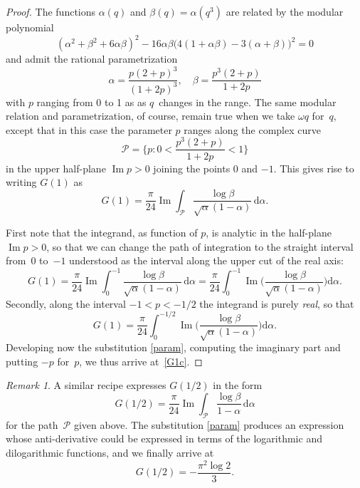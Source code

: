 \documentclass[12pt,reqno]{amsart}
\theoremstyle{remark}
\newtheorem*{remark}{Remark}
\begin{document}
\begin{proof}
The functions $\alpha(q)$ and $\beta(q)=\alpha(q^3)$ are related by the modular polynomial
$$
(\alpha^2+\beta^2+6\alpha\beta)^2-16\alpha\beta\bigl(4(1+\alpha\beta)-3(\alpha+\beta)\bigr)^2=0
$$
and admit the rational parametrization
\begin{equation}
\alpha=\frac{p(2+p)^3}{(1+2p)^3}, \quad \beta=\frac{p^3(2+p)}{1+2p}
\label{param}
\end{equation}
with $p$ ranging from 0 to 1 as as $q$~changes in the range.
The same modular relation and parametrization, of course, remain true when we take
$\omega q$ for~$q$, except that in this case the parameter $p$ ranges along the
complex curve
$$
\mathcal P=\biggl\{p:0<\frac{p^3(2+p)}{1+2p}<1\biggr\}
$$
in the upper half-plane ${\operatorname{Im}} p>0$ joining the points 0 and $-1$.
This gives rise to writing $G(1)$ as
\begin{equation*}
G(1)=\frac{\pi}{24}{\operatorname{Im}}\int_{\mathcal P}\frac{\log\beta}{\sqrt\alpha(1-\alpha)}\,{{\mathrm d}}\alpha.
\end{equation*}

First note that the integrand, as function of $p$, is analytic in the half-plane
${\operatorname{Im}} p>0$, so that we can change the path of integration to the straight interval
from~0 to~$-1$ understood as the interval along the upper cut of the real axis:
\begin{equation*}
G(1)=\frac{\pi}{24}{\operatorname{Im}}\int_0^{-1}\frac{\log\beta}{\sqrt\alpha(1-\alpha)}\,{{\mathrm d}}\alpha
=\frac{\pi}{24}\int_0^{-1}{\operatorname{Im}}\biggl(\frac{\log\beta}{\sqrt\alpha(1-\alpha)}\biggr){{\mathrm d}}\alpha.
\end{equation*}
Secondly, along the interval $-1<p<-1/2$ the integrand is purely \emph{real},
so that
\begin{equation*}
G(1)=\frac{\pi}{24}\int_0^{-1/2}{\operatorname{Im}}\biggl(\frac{\log\beta}{\sqrt\alpha(1-\alpha)}\biggr){{\mathrm d}}\alpha.
\end{equation*}
Developing now the substitution \eqref{param}, computing the imaginary part
and putting $-p$ for~$p$, we thus arrive at~\eqref{G1c}.
\end{proof}

\begin{remark}
A similar recipe expresses $G(1/2)$ in the form
\begin{equation}
G(1/2)=\frac\pi{24}{\operatorname{Im}}\int_{\mathcal P}\frac{\log\beta}{1-\alpha}\,{{\mathrm d}}\alpha
\label{G12}
\end{equation}
for the path~$\mathcal P$ given above. The substitution \eqref{param}
produces an expression whose anti-derivative could be expressed in
terms of the logarithmic and dilogarithmic functions, and we finally
arrive at
$$
G(1/2)=-\frac{\pi^2\log2}3.
$$
\end{remark}
\end{document}
